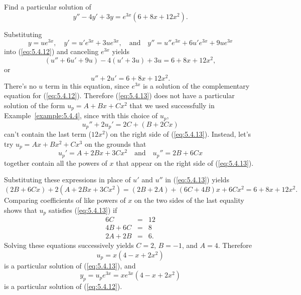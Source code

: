 \documentclass{ximera}
\begin{document}
\begin{example}\label{example:5.4.5}
 Find a particular solution of
\begin{equation} \label{eq:5.4.12}
y''-4y'+3y=e^{3x}(6+8x+12x^2).
\end{equation}
 
\begin{explanation}
Substituting
$$
y=ue^{3x},\quad y'=u'e^{3x}+3ue^{3x},\quad\mbox{and}\quad
y''=u''e^{3x}+6u'e^{3x}+9ue^{3x}
$$
into (\ref{eq:5.4.12}) and  canceling $e^{3x}$  yields
$$
(u''+6u'+9u)-4(u'+3u)+3u=6+8x+12x^2,
$$
or
\begin{equation} \label{eq:5.4.13}
u''+2u'=6+8x+12x^2.
\end{equation}
There's no $u$ term in this equation, since $e^{3x}$ is a solution of
the complementary equation for (\ref{eq:5.4.12}).
Therefore (\ref{eq:5.4.13}) does not have a
particular solution of the form $u_p=A+Bx+Cx^2$ that we used
successfully in Example~\ref{example:5.4.4}, since with this choice of
$u_p$,
$$
u_p''+2u_p'=2C+(B+2Cx)
$$
can't contain the last term ($12x^2$) on the right side of
(\ref{eq:5.4.13}). Instead, let's try $u_p=Ax+Bx^2+Cx^3$ on the grounds
that
$$
u_p'=A+2Bx+3Cx^2\quad\mbox{and}\quad
u_p''=2B+6Cx
$$
together contain all the powers of $x$ that appear on the right side
of (\ref{eq:5.4.13}).
 
Substituting these expressions in place of $u'$ and $u''$  in
(\ref{eq:5.4.13}) yields
$$
(2B+6Cx)+2(A+2Bx+3Cx^2)=(2B+2A)+(6C+4B)x+6Cx^2=6+8x+12x^2.
$$
Comparing coefficients of like powers of $x$ on the two sides of the
last equality shows that $u_p$ satisfies (\ref{eq:5.4.13}) if
$$
\begin{array}{rcr}
6C&=&12\\
4B+6C&=&8\\
2A+2B&=&6.
\end{array}
$$
Solving these equations successively yields $C=2$, $B=-1$, and $A=4$.
Therefore
$$
u_p=x(4-x+2x^2)
$$
is a particular solution of  (\ref{eq:5.4.13}),
and
$$
y_p=u_pe^{3x}=xe^{3x}(4-x+2x^2)
$$
is a particular solution of  (\ref{eq:5.4.12}).
\end{explanation}
\end{example}
 
\end{document}
